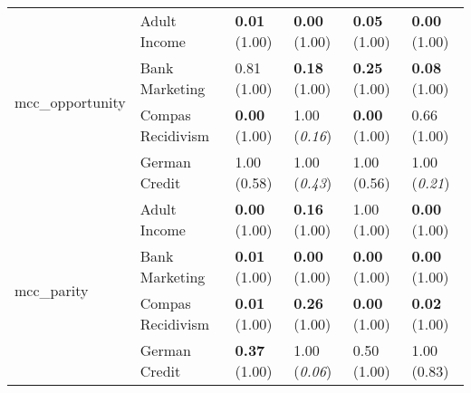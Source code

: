 \begin{tabular}{llllll}
\cline{1-6}
\multirow[t]{4}{*}{mcc_opportunity} & Adult Income & \textbf{0.01} (1.00) & \textbf{0.00} (1.00) & \textbf{0.05} (1.00) & \textbf{0.00} (1.00) \\
 & Bank Marketing & 0.81 (1.00) & \textbf{0.18} (1.00) & \textbf{0.25} (1.00) & \textbf{0.08} (1.00) \\
 & Compas Recidivism & \textbf{0.00} (1.00) & 1.00 (\textit{0.16}) & \textbf{0.00} (1.00) & 0.66 (1.00) \\
 & German Credit & 1.00 (0.58) & 1.00 (\textit{0.43}) & 1.00 (0.56) & 1.00 (\textit{0.21}) \\
\cline{1-6}
\multirow[t]{4}{*}{mcc_parity} & Adult Income & \textbf{0.00} (1.00) & \textbf{0.16} (1.00) & 1.00 (1.00) & \textbf{0.00} (1.00) \\
 & Bank Marketing & \textbf{0.01} (1.00) & \textbf{0.00} (1.00) & \textbf{0.00} (1.00) & \textbf{0.00} (1.00) \\
 & Compas Recidivism & \textbf{0.01} (1.00) & \textbf{0.26} (1.00) & \textbf{0.00} (1.00) & \textbf{0.02} (1.00) \\
 & German Credit & \textbf{0.37} (1.00) & 1.00 (\textit{0.06}) & 0.50 (1.00) & 1.00 (0.83) \\
\cline{1-6}
\bottomrule
\end{tabular}

